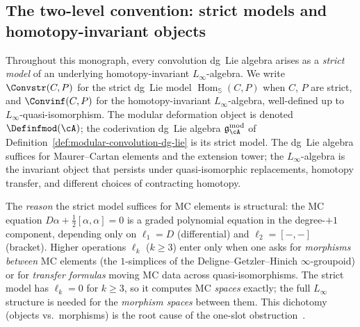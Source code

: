
\subsection{The two-level convention: strict models and homotopy-invariant objects}
\label{subsec:two-level-convention}

\begin{remark}
\label{rem:two-level-convention}
Throughout this monograph, every convolution dg~Lie algebra arises
as a \emph{strict model} of an underlying homotopy-invariant
$L_\infty$-algebra.  We write $\Convstr(C,P)$ for the strict
dg~Lie model $\operatorname{Hom}_{\mathbb{S}}(C,P)$ when $C$, $P$
are strict, and $\Convinf(C,P)$ for the homotopy-invariant
$L_\infty$-algebra, well-defined up to $L_\infty$-quasi-isomorphism.
The modular deformation object is denoted
$\Definfmod(\cA)$; the coderivation dg~Lie algebra
$\mathfrak{g}_{\cA}^{\mathrm{mod}}$ of
Definition~\ref{def:modular-convolution-dg-lie} is its strict model.
The dg~Lie algebra suffices for Maurer--Cartan elements and the
extension tower; the $L_\infty$-algebra is the invariant object
that persists under quasi-isomorphic replacements, homotopy
transfer, and different choices of contracting homotopy.

The \emph{reason} the strict model suffices for MC elements is
structural: the MC equation
$D\alpha + \tfrac{1}{2}[\alpha,\alpha] = 0$ is a graded polynomial
equation in the degree-$+1$ component, depending only on
$\ell_1 = D$ (differential) and $\ell_2 = [-,-]$ (bracket).
Higher operations $\ell_k$ ($k \geq 3$) enter only when one asks
for \emph{morphisms between} MC elements (the $1$-simplices of
the Deligne--Getzler--Hinich $\infty$-groupoid) or for
\emph{transfer formulas} moving MC data across quasi-isomorphisms.
The strict model has $\ell_k = 0$ for $k \geq 3$, so it computes
MC \emph{spaces} exactly; the full $L_\infty$ structure is needed
for the \emph{morphism spaces} between them.  This dichotomy
(objects vs.\ morphisms) is the root cause of the one-slot
obstruction~\cite[Section~6]{RNW19}.


\end{remark}
